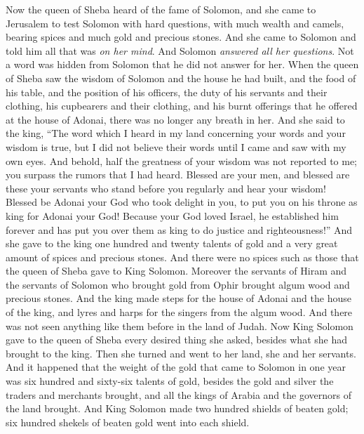 \begin{biblechapter} %
 Now the queen of Sheba heard of the fame of Solomon, and she came to Jerusalem to test Solomon with hard questions, with much wealth and camels, bearing spices and much gold and precious stones. And she came to Solomon and told him all that was \textit{on her mind}.
\verse And Solomon \textit{answered all her questions}. Not a word was hidden from Solomon that he did not answer for her.
\verse When the queen of Sheba saw the wisdom of Solomon and the house he had built,
\verse and the food of his table, and the position of his officers, the duty of his servants and their clothing, his cupbearers and their clothing, and his burnt offerings that he offered at the house of Adonai, there was no longer any breath in her.
\verse And she said to the king, “The word which I heard in my land concerning your words and your wisdom is true,
\verse but I did not believe their words until I came and saw with my own eyes. And behold, half the greatness of your wisdom was not reported to me; you surpass the rumors that I had heard.
\verse Blessed are your men, and blessed are these your servants who stand before you regularly and hear your wisdom!
\verse Blessed be Adonai your God who took delight in you, to put you on his throne as king for Adonai your God! Because your God loved Israel, he established him forever and has put you over them as king to do justice and righteousness!”
\verse And she gave to the king one hundred and twenty talents of gold and a very great amount of spices and precious stones. And there were no spices such as those that the queen of Sheba gave to King Solomon.
\verse Moreover the servants of Hiram and the servants of Solomon who brought gold from Ophir brought algum wood and precious stones.
\verse And the king made steps for the house of Adonai and the house of the king, and lyres and harps for the singers from the algum wood. And there was not seen anything like them before in the land of Judah.
\verse Now King Solomon gave to the queen of Sheba every desired thing she asked, besides what she had brought to the king. Then she turned and went to her land, she and her servants.
 And it happened that the weight of the gold that came to Solomon in one year was six hundred and sixty-six talents of gold,
\verse besides the gold and silver the traders and merchants brought, and all the kings of Arabia and the governors of the land brought.
\verse And King Solomon made two hundred shields of beaten gold; six hundred shekels of beaten gold went into each shield.

\end{biblechapter}

